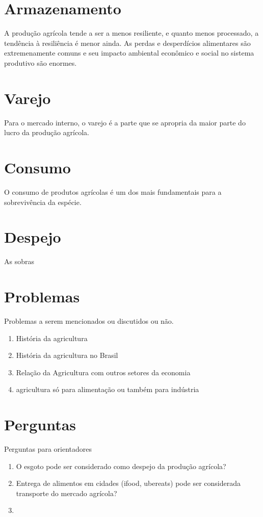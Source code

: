 \documentclass[]{article}
\begin{document}
	
	\section{Armazenamento}
	
	A produção agrícola tende a ser a menos resiliente, e quanto menos processado, a tendência à resiliência é menor ainda. As perdas e desperdícios alimentares são extremenamente comuns e seu impacto ambiental econômico e social no sistema produtivo são enormes. 
	
	\section{Varejo}
	
	Para o mercado interno, o varejo é a parte que se apropria da maior parte do lucro da produção agrícola.
	
	\section{Consumo}
	
	O consumo de produtos agrícolas é um dos mais fundamentais para a sobrevivência da espécie. 
	
	\section{Despejo}
	
	As sobras 
	
	
	\section{Problemas}
	
	Problemas a serem mencionados ou discutidos ou não.
	
	\begin{enumerate}
		\item História da agricultura
		
		\item História da agricultura no Brasil
		
		\item Relação da Agricultura com outros setores da economia
		
		\item agricultura só para alimentação ou também para indústria
	\end{enumerate}
	
	\section{Perguntas}
	
	Perguntas para orientadores
	
	\begin{enumerate}
		\item O esgoto pode ser considerado como despejo da produção agrícola?
		
		\item Entrega de alimentos em cidades (ifood, ubereats) pode ser considerada transporte do mercado agrícola?
		
		\item 
		
	\end{enumerate}
	
	
\end{document}
